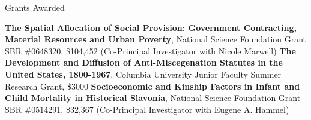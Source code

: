 \begin{rubric}{Grants Awarded}

\entry*[2007] \textbf{The Spatial Allocation of Social Provision: Government Contracting, Material Resources and Urban Poverty}, National Science Foundation Grant SBR \#0648320, \$104,452 (Co-Principal Investigator with Nicole Marwell) 
\entry*[2006] \textbf{The Development and Diffusion of Anti-Miscegenation Statutes in the United States, 1800-1967}, Columbia University Junior Faculty Summer Research Grant, \$3000  
\entry*[2005] \textbf{Socioeconomic and Kinship Factors in Infant and Child Mortality in Historical Slavonia}, National Science Foundation Grant SBR \#0514291, \$32,367 (Co-Principal Investigator with Eugene A. Hammel) 

\end{rubric}